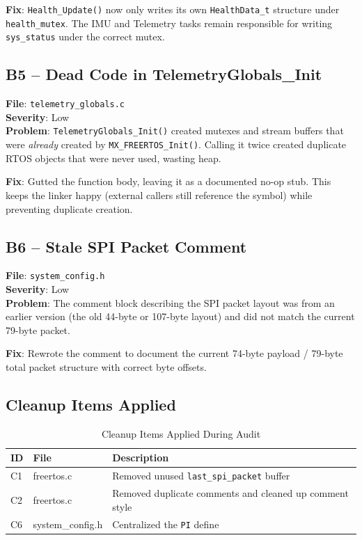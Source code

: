 \documentclass[11pt,a4paper]{article}
\begin{document}
\textbf{Fix}: \texttt{Health\_Update()} now only writes its own
\texttt{HealthData\_t} structure under \texttt{health\_mutex}.  The IMU and
Telemetry tasks remain responsible for writing \texttt{sys\_status} under the
correct mutex.

\subsection{B5 -- Dead Code in TelemetryGlobals\_Init}

\textbf{File}: \texttt{telemetry\_globals.c} \\
\textbf{Severity}: Low \\
\textbf{Problem}: \texttt{TelemetryGlobals\_Init()} created mutexes and stream
buffers that were \emph{already} created by \texttt{MX\_FREERTOS\_Init()}.  Calling
it twice created duplicate RTOS objects that were never used, wasting heap.

\textbf{Fix}: Gutted the function body, leaving it as a documented no-op stub.
This keeps the linker happy (external callers still reference the symbol) while
preventing duplicate creation.

\subsection{B6 -- Stale SPI Packet Comment}

\textbf{File}: \texttt{system\_config.h} \\
\textbf{Severity}: Low \\
\textbf{Problem}: The comment block describing the SPI packet layout was from an
earlier version (the old 44-byte or 107-byte layout) and did not match the
current 79-byte packet.

\textbf{Fix}: Rewrote the comment to document the current 74-byte payload /
79-byte total packet structure with correct byte offsets.

\subsection{Cleanup Items Applied}

\begin{table}[H]
\centering
\begin{tabular}{@{}llp{8cm}@{}}
\toprule
\textbf{ID} & \textbf{File} & \textbf{Description} \\
\midrule
C1 & freertos.c & Removed unused \texttt{last\_spi\_packet} buffer \\
C2 & freertos.c & Removed duplicate comments and cleaned up comment style \\
C6 & system\_config.h & Centralized the \texttt{PI} define \\
\bottomrule
\end{tabular}
\caption{Cleanup Items Applied During Audit}
\end{table}
\end{document}
